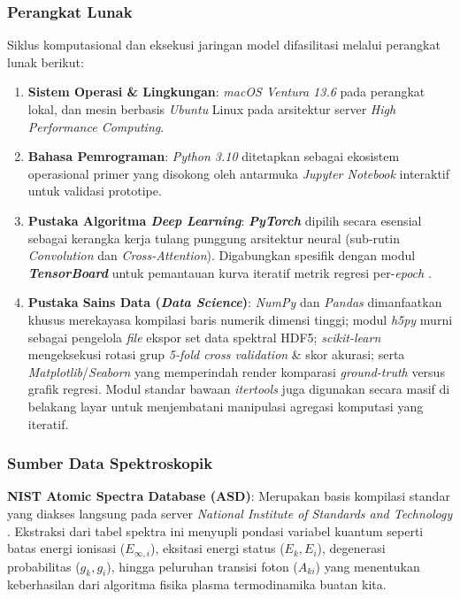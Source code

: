 \documentclass[12pt, a4paper]{article}
\begin{document}
\subsubsection{Perangkat Lunak}
Siklus komputasional dan eksekusi jaringan model difasilitasi melalui perangkat lunak berikut:
\begin{enumerate}
    \item \textbf{Sistem Operasi \& Lingkungan}: \textit{macOS Ventura 13.6} pada perangkat lokal, dan mesin berbasis \textit{Ubuntu} Linux pada arsitektur server \textit{High Performance Computing}.
    \item \textbf{Bahasa Pemrograman}: \textit{Python 3.10} ditetapkan sebagai ekosistem operasional primer yang disokong oleh antarmuka \textit{Jupyter Notebook} interaktif untuk validasi prototipe.
    \item \textbf{Pustaka Algoritma \textit{Deep Learning}}: \textbf{\textit{PyTorch}} dipilih secara esensial sebagai kerangka kerja tulang punggung arsitektur neural (sub-rutin \textit{Convolution} dan \textit{Cross-Attention}). Digabungkan spesifik dengan modul \textbf{\textit{TensorBoard}} untuk pemantauan kurva iteratif metrik regresi per-\textit{epoch} \cite{paszke2019}.
    \item \textbf{Pustaka Sains Data (\textit{Data Science})}: \textit{NumPy} dan \textit{Pandas} dimanfaatkan khusus merekayasa kompilasi baris numerik dimensi tinggi; modul \textit{h5py} murni sebagai pengelola \textit{file} ekspor set data spektral HDF5; \textit{scikit-learn} mengeksekusi rotasi grup \textit{5-fold cross validation} \& skor akurasi; serta \textit{Matplotlib}/\textit{Seaborn} yang memperindah render komparasi \textit{ground-truth} versus grafik regresi. Modul standar bawaan \textit{itertools} juga digunakan secara masif di belakang layar untuk menjembatani manipulasi agregasi komputasi yang iteratif.
\end{enumerate}

\subsubsection{Sumber Data Spektroskopik}
\textbf{NIST Atomic Spectra Database (ASD)}: Merupakan basis kompilasi standar yang diakses langsung pada server \textit{National Institute of Standards and Technology} \cite{kramida2024}. Ekstraksi dari tabel spektra ini menyupli pondasi variabel kuantum seperti batas energi ionisasi ($E_{\infty,i}$), eksitasi energi status ($E_k, E_i$), degenerasi probabilitas ($g_k, g_i$), hingga peluruhan transisi foton ($A_{ki}$) yang menentukan keberhasilan dari algoritma fisika plasma termodinamika buatan kita.
\end{document}
